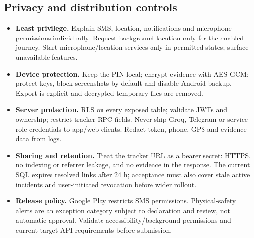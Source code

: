 \subsection{Privacy and distribution controls}
\begin{itemize}
\item \textbf{Least privilege.} Explain SMS, location, notifications and microphone permissions individually. Request background location only for the enabled journey. Start microphone/location services only in permitted states; surface unavailable features.
\item \textbf{Device protection.} Keep the PIN local; encrypt evidence with AES-GCM; protect keys, block screenshots by default and disable Android backup. Export is explicit and decrypted temporary files are removed.
\item \textbf{Server protection.} RLS on every exposed table; validate JWTs and ownership; restrict tracker RPC fields. Never ship Groq, Telegram or service-role credentials to app/web clients. Redact token, phone, GPS and evidence data from logs.
\item \textbf{Sharing and retention.} Treat the tracker URL as a bearer secret: HTTPS, no indexing or referrer leakage, and no evidence in the response. The current SQL expires resolved links after 24 h; acceptance must also cover stale active incidents and user-initiated revocation before wider rollout.
\item \textbf{Release policy.} Google Play restricts SMS permissions. Physical-safety alerts are an exception category subject to declaration and review, not automatic approval. Validate accessibility/background permissions and current target-API requirements before submission. 
\end{itemize}

